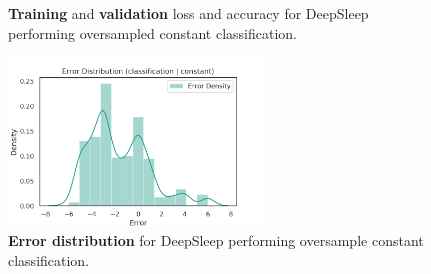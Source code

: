 \documentclass[11pt]{scrartcl}
\begin{document}
\begin{figure}[!hbt]
	\caption{\textcolor{viridis9}{\textbf{Training}} and \textcolor{viridis0}{\textbf{validation}} loss and accuracy for DeepSleep performing oversampled constant classification.}
\end{figure}

\begin{figure}[hbt]
	\centering
	\includegraphics[width=0.6\textwidth]{img/learning/original_gdansk_sleepnet_classification_constant_oversample_unweighted_error_distribution.png}
	\caption{\textcolor{viridis5}{\textbf{Error distribution}} for DeepSleep performing oversample constant classification.}
	\label{fig:original_gdansk_sleepnet_classification_constant_oversample_unweighted_error_distribution}
\end{figure}
\end{document}

